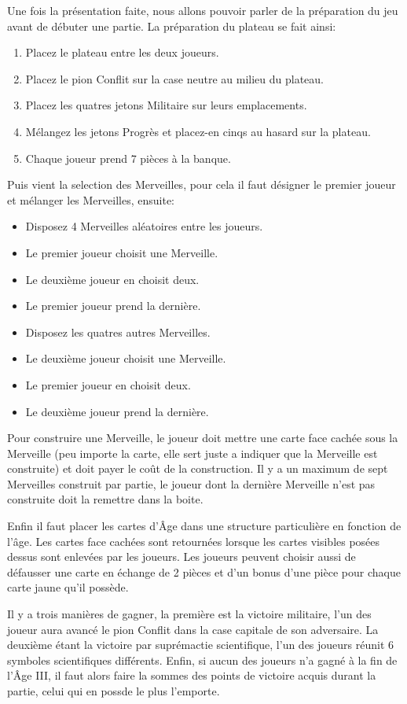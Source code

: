 \documentclass[a4paper, 12pt, french]{article}
\begin{document}
	Une fois la présentation faite, nous allons pouvoir parler de la préparation du jeu avant de débuter une partie.
	La préparation du plateau se fait ainsi:
	\begin{enumerate}
		\item Placez le plateau entre les deux joueurs.
		\item Placez le pion Conflit sur la case neutre au milieu du plateau.
		\item Placez les quatres jetons Militaire sur leurs emplacements.
		\item Mélangez les jetons Progrès et placez-en cinqs au hasard sur la plateau.
		\item Chaque joueur prend 7 pièces à la banque.
	\end{enumerate}

	Puis vient la selection des Merveilles, pour cela il faut désigner le premier joueur et mélanger les Merveilles,
	ensuite:
	\begin{itemize}
		\item Disposez 4 Merveilles aléatoires entre les joueurs.
		\item Le premier joueur choisit une Merveille.
		\item Le deuxième joueur en choisit deux.
		\item Le premier joueur prend la dernière.
		\item Disposez les quatres autres Merveilles.
		\item Le deuxième joueur choisit une Merveille.
		\item Le premier joueur en choisit deux.
		\item Le deuxième joueur prend la dernière.
	\end{itemize}
	Pour construire une Merveille, le joueur doit mettre une carte face cachée sous la Merveille (peu importe la
	carte, elle sert juste a indiquer que la Merveille est construite) et doit payer le coût de la construction.
	Il y a un maximum de sept Merveilles construit par partie, le joueur dont la dernière Merveille n'est pas
	construite doit la remettre dans la boite.

	Enfin il faut placer les cartes d'Âge dans une structure particulière en fonction de l'âge. Les cartes face
	cachées sont retournées lorsque les cartes visibles posées dessus sont enlevées par les joueurs. Les joueurs
	peuvent choisir aussi de défausser une carte en échange de 2 pièces et d'un bonus d'une pièce pour chaque carte
	jaune qu'il possède.

	Il y a trois manières de gagner, la première est la victoire militaire, l'un des joueur aura avancé le pion
	Conflit dans la case capitale de son adversaire. La deuxième étant la victoire par suprémactie scientifique,
	l'un des joueurs réunit 6 symboles scientifiques différents. Enfin, si aucun des joueurs n'a gagné à la fin de
	l'Âge III, il faut alors faire la sommes des points de victoire acquis durant la partie,
	celui qui en possde le plus l'emporte.
\end{document}
